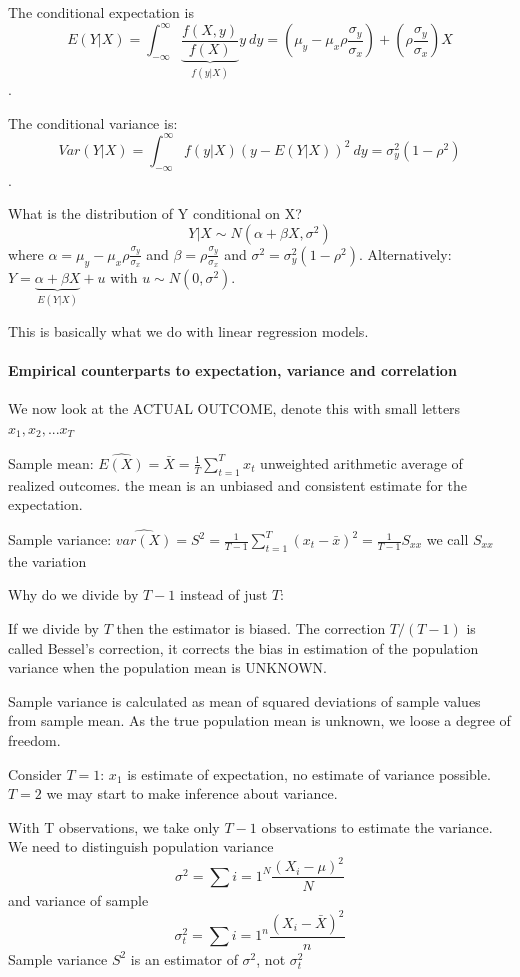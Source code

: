 \documentclass{article}
\begin{document}
The conditional expectation is
$$E(Y|X) = \int_{-\infty}^{\infty}\underbrace{\frac{f(X,y)}{f(X)}}_{f(y|X)}y~dy = \left(\mu_y -\mu_x\rho\frac{\sigma_y}{\sigma_x}\right)+\left(\rho \frac{\sigma_y}{\sigma_x}\right) X$$.

The conditional variance is:
$$Var(Y|X) = \int_{-\infty}^{\infty}f(y|X)(y-E(Y|X))^2~dy = \sigma_y^2(1-\rho^2)$$.

What is the distribution of Y conditional on X?
$$Y|X \sim N(\alpha + \beta X, \sigma^2)$$
where $\alpha = \mu_y - \mu_x\rho\frac{\sigma_y}{\sigma_x}$ and $\beta=\rho \frac{\sigma_y}{\sigma_x}$ and $\sigma^2 = \sigma_y^2(1-\rho^2)$. Alternatively:
$Y = \underbrace{\alpha + \beta X}_{E(Y|X)} + u$ with $u\sim N(0,\sigma^2)$.

This is basically what we do with linear regression models.

\paragraph{Empirical counterparts to expectation, variance and correlation}
We now look at the ACTUAL OUTCOME, denote this with small letters $x_1,x_2,...x_T$

Sample mean: $\widehat{E(X)} = \bar{X} = \frac{1}{T} \sum_{t=1}^{T} x_t$ unweighted arithmetic average of realized outcomes. the mean is an unbiased and consistent estimate for the expectation.

Sample variance: $\widehat{var(X)} = S^2 = \frac{1}{T-1} \sum_{t=1}^{T} (x_t -\bar{x})^2 = \frac{1}{T-1} S_{xx}$ we call $S_{xx}$ the variation

Why do we divide by $T-1$ instead of just $T$:

If we divide by $T$ then the estimator is biased. The correction $T/(T-1)$ is called Bessel's correction, it corrects the bias in estimation of the population variance when the population mean is UNKNOWN.

Sample variance is calculated as mean of squared deviations of sample values from sample mean. As the true population mean is unknown, we loose a degree of freedom.

Consider $T=1$: $x_1$ is estimate of expectation, no estimate of variance possible. $T=2$ we may start to make inference about variance.

With T observations, we take only $T-1$ observations to estimate the variance. We need to distinguish population variance
$$\sigma^2 = \sum{i=1}^N \frac{(X_i -\mu)^2}{N}$$
and variance of sample
$$\sigma_t^2 = \sum{i=1}^n \frac{(X_i -\bar{X})^2}{n}$$
Sample variance $S^2$ is an estimator of $\sigma^2$, not $\sigma_t^2$
\end{document}
